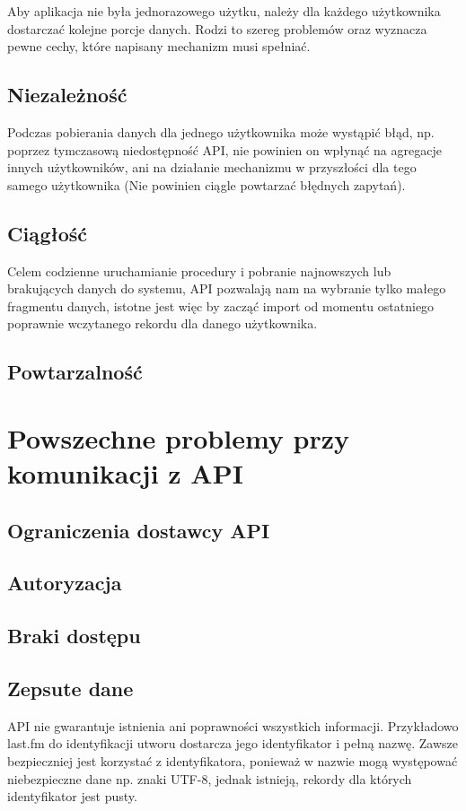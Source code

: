 \documentclass[brudnopis]{xmgr}
\begin{document}
        Aby aplikacja nie była jednorazowego użytku, należy dla każdego użytkownika dostarczać kolejne porcje danych.
        Rodzi to szereg problemów oraz wyznacza pewne cechy, które napisany mechanizm musi spełniać.

        \subsection*{Niezależność}
        Podczas pobierania danych dla jednego użytkownika może wystąpić błąd, np. poprzez tymczasową niedostępność API,
        nie powinien on wpłynąć na agregacje innych użytkowników, ani na działanie mechanizmu w przyszłości dla tego samego użytkownika
        (Nie powinien ciągle powtarzać błędnych zapytań).

        \subsection*{Ciągłość}
        Celem codzienne uruchamianie procedury i pobranie najnowszych lub brakujących danych do systemu,
        API pozwalają nam na wybranie tylko małego fragmentu danych, istotne jest więc by zacząć import
        od momentu ostatniego poprawnie wczytanego rekordu dla danego użytkownika.

        \subsection*{Powtarzalność}

    \section{Powszechne problemy przy komunikacji z API}

        \subsection*{Ograniczenia dostawcy API}

        \subsection*{Autoryzacja}

        \subsection*{Braki dostępu}

        \subsection*{Zepsute dane}
        API nie gwarantuje istnienia ani poprawności wszystkich informacji.
        Przykładowo last.fm do identyfikacji utworu dostarcza jego identyfikator i pełną nazwę.
        Zawsze bezpieczniej jest korzystać z identyfikatora, ponieważ w nazwie mogą występować niebezpieczne dane np. znaki UTF-8,
        jednak istnieją, rekordy dla których identyfikator jest pusty.
\end{document}
